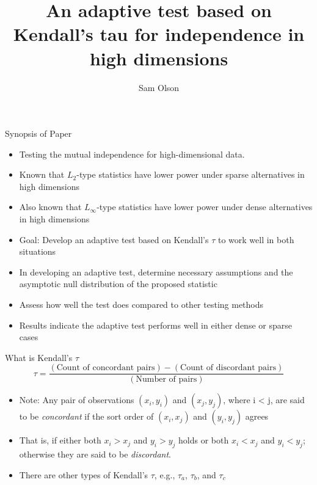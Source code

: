 \documentclass[
  ignorenonframetext,
]{beamer}
\title{An adaptive test based on Kendall's tau for independence in high
dimensions}
\author{Sam Olson}
\date{}
\providecommand{\tightlist}{%
  \setlength{\itemsep}{0pt}\setlength{\parskip}{0pt}}
\begin{document}
\frame{\titlepage}

\begin{frame}{Synopsis of Paper}
\label{synopsis-of-paper}
\begin{itemize}
\tightlist
\item
  Testing the mutual independence for high-dimensional data.
\item
  Known that \(L_2\)-type statistics have lower power under sparse
  alternatives in high dimensions
\item
  Also known that \(L_\infty\)-type statistics have lower power under
  dense alternatives in high dimensions
\item
  Goal: Develop an adaptive test based on Kendall's \(\tau\) to work
  well in both situations
\item
  In developing an adaptive test, determine necessary assumptions and
  the asymptotic null distribution of the proposed statistic
\item
  Assess how well the test does compared to other testing methods
\item
  Results indicate the adaptive test performs well in either dense or
  sparse cases
\end{itemize}
\end{frame}

\begin{frame}{What is Kendall's \(\tau\)}
\label{what-is-kendalls-tau}
\[
\tau = \frac{(\text{Count of concordant pairs}) - (\text{Count of discordant pairs})}{(\text{Number of pairs})}
\]

\begin{itemize}
\tightlist
\item
  Note: Any pair of observations \((x_i, y_i)\) and \((x_j, y_j)\),
  where i \textless{} j, are said to be \emph{concordant} if the sort
  order of \((x_i, x_j)\) and \((y_i, y_j)\) agrees
\item
  That is, if either both \(x_i > x_j\) and \(y_i > y_j\) holds or both
  \(x_i < x_j\) and \(y_i < y_j\); otherwise they are said to be
  \emph{discordant}.
\item
  There are other types of Kendall's \(\tau\), e.g., \(\tau_a\),
  \(\tau_b\), and \(\tau_c\)
\end{itemize}
\end{frame}
\end{document}
